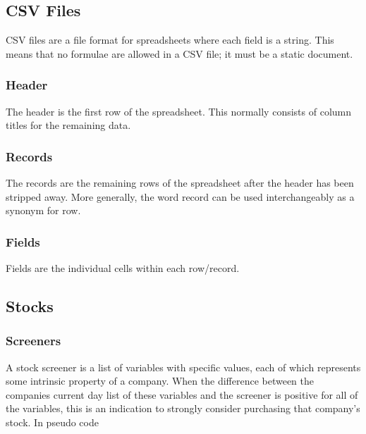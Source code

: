 \subsection{CSV Files}
CSV files are a file format for spreadsheets where each field is a string. This means that no formulae are allowed in a CSV file; it must be a static document.

\subsubsection{Header}
The header is the first row of the spreadsheet. This normally consists of column titles for the remaining data.

\subsubsection{Records}
The records are the remaining rows of the spreadsheet after the header has been stripped away. More generally, the word record can be used interchangeably as a synonym for row.

\subsubsection{Fields}
Fields are the individual cells within each row/record.

\subsection{Stocks}
\subsubsection{Screeners}
A stock screener is a list of variables with specific values, each of which represents some intrinsic property of a company. When the difference between the companies current day list of these variables and the screener is positive for all of the variables, this is an indication to strongly consider purchasing that company's stock. In pseudo code 